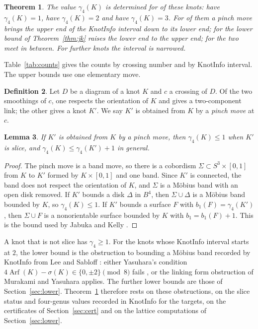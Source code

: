 \documentclass[11pt]{amsart}
\newtheorem{theorem}{Theorem}
\newtheorem{lemma}[theorem]{Lemma}
\theoremstyle{definition}
\newtheorem{definition}[theorem]{Definition}
\theoremstyle{remark}
\begin{document}
\begin{theorem}\label{thm:main}
The value $\gamma_4(K)$ is determined for \nsettled{} of these knots: \nsettledone{} have
$\gamma_4(K)=1$, \nsettledtwo{} have $\gamma_4(K)=2$ and \nsettledthree{} have
$\gamma_4(K)=3$. For \nsettledpinch{} of them a pinch move brings the upper end of the
KnotInfo interval down to its lower end; for \nsettledlower{} the lower bound of
Theorem~\ref{thm:jk} raises the lower end to the upper end; for \nsettledboth{} the two
meet in between. For \nnarrowed{} further knots the interval is narrowed.
\end{theorem}

Table~\ref{tab:counts} gives the counts by crossing number and by KnotInfo interval. The
upper bounds use one elementary move.

\begin{definition}
Let $D$ be a diagram of a knot $K$ and $c$ a crossing of $D$. Of the two smoothings of $c$,
one respects the orientation of $K$ and gives a two-component link; the other gives a knot
$K'$. We say $K'$ is obtained from $K$ by a \emph{pinch move} at $c$.
\end{definition}

\begin{lemma}\label{lem:pinch}
If $K'$ is obtained from $K$ by a pinch move, then $\gamma_4(K)\le 1$ when $K'$ is slice,
and $\gamma_4(K)\le\gamma_4(K')+1$ in general.
\end{lemma}

\begin{proof}
The pinch move is a band move, so there is a cobordism $\Sigma\subset S^3\times[0,1]$ from
$K$ to $K'$ formed by $K\times[0,1]$ and one band. Since $K'$ is connected, the band does not
respect the orientation of $K$, and $\Sigma$ is a M\"obius band with an open disk removed. If $K'$ bounds a disk $\Delta$ in $B^4$, then
$\Sigma\cup\Delta$ is a M\"obius band bounded by $K$, so $\gamma_4(K)\le1$. If $K'$ bounds
a surface $F$ with $b_1(F)=\gamma_4(K')$, then $\Sigma\cup F$ is a nonorientable surface
bounded by $K$ with $b_1=b_1(F)+1$. This is the bound used by Jabuka and Kelly \cite{JK}.
\end{proof}

A knot that is not slice has $\gamma_4\ge1$. For the knots whose KnotInfo interval starts
at $2$, the lower bound is the obstruction to bounding a M\"obius band recorded by KnotInfo
from Lee and Sabloff \cite{LS}: either Yasuhara's condition
$4\operatorname{Arf}(K)-\sigma(K)\in\{0,\pm2\}\pmod 8$ fails \cite{Ya}, or the linking form
obstruction of Murakami and Yasuhara \cite{MY} applies. The further lower bounds are those of
Section~\ref{sec:lower}. Theorem~\ref{thm:main} therefore rests on these obstructions, on
the slice status and four-genus values recorded in KnotInfo for the targets, on the
certificates of Section~\ref{sec:cert} and on the lattice computations of
Section~\ref{sec:lower}.
\end{document}
